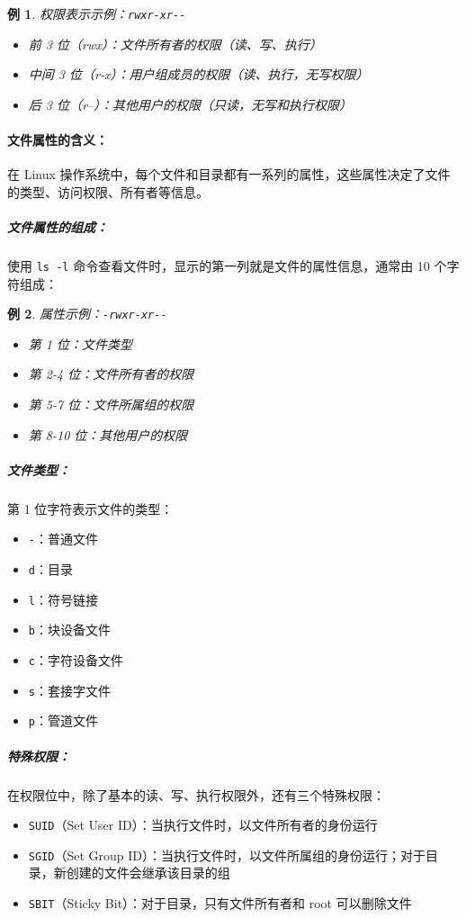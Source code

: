 \documentclass[12pt,UTF8]{ctexbook}
\newtheorem{example}{例}[chapter]
\begin{document}
\begin{example}
权限表示示例：\verb+rwxr-xr--+
\begin{itemize}
    \item 前 3 位（rwx）：文件所有者的权限（读、写、执行）
    \item 中间 3 位（r-x）：用户组成员的权限（读、执行，无写权限）
    \item 后 3 位（r--）：其他用户的权限（只读，无写和执行权限）
\end{itemize}
\end{example}

\paragraph{文件属性的含义：}
在 Linux 操作系统中，每个文件和目录都有一系列的属性，这些属性决定了文件的类型、访问权限、所有者等信息。

\subparagraph{文件属性的组成：}
使用 \verb+ls -l+ 命令查看文件时，显示的第一列就是文件的属性信息，通常由 10 个字符组成：

\begin{example}
属性示例：\verb+-rwxr-xr--+
\begin{itemize}
    \item 第 1 位：文件类型
    \item 第 2-4 位：文件所有者的权限
    \item 第 5-7 位：文件所属组的权限
    \item 第 8-10 位：其他用户的权限
\end{itemize}
\end{example}

\subparagraph{文件类型：}
第 1 位字符表示文件的类型：
\begin{itemize}
    \item \verb+-+：普通文件
    \item \verb+d+：目录
    \item \verb+l+：符号链接
    \item \verb+b+：块设备文件
    \item \verb+c+：字符设备文件
    \item \verb+s+：套接字文件
    \item \verb+p+：管道文件
\end{itemize}

\subparagraph{特殊权限：}
在权限位中，除了基本的读、写、执行权限外，还有三个特殊权限：
\begin{itemize}
    \item \verb+SUID+（Set User ID）：当执行文件时，以文件所有者的身份运行
    \item \verb+SGID+（Set Group ID）：当执行文件时，以文件所属组的身份运行；对于目录，新创建的文件会继承该目录的组
    \item \verb+SBIT+（Sticky Bit）：对于目录，只有文件所有者和 root 可以删除文件
\end{itemize}
\end{document}
